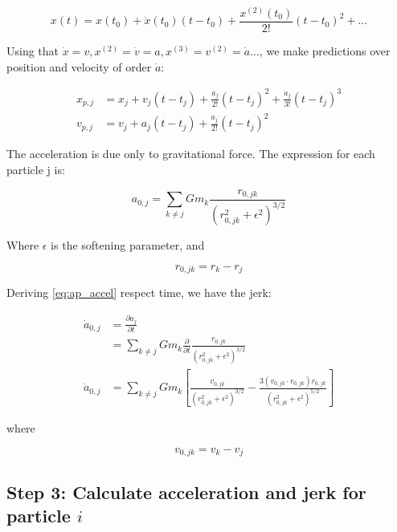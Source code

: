 \begin{appendixs}
	\begin{equation}
		x(t) = x(t_0) + \dot{x}(t_0)(t - t_0) + \frac{x^{(2)}(t_0)}{2!}(t - t_0)^2 + ...
	\end{equation}
	
	Using that $\dot{x} = v, x^{(2)} = \dot{v} = a, x^{(3)} = v^{(2)} = \dot{a} ...$, we make predictions over position and velocity of order $\dot{a}$:
	
	\begin{align}
		x_{p, j} &= x_j + v_j (t - t_j) + \frac{a_j}{2!} (t-t_j)^2 + \frac{\dot{a}_j}{3!} (t-t_j)^3 \label{eq:ap_xpred} \\
		v_{p, j} &= v_j + a_j (t - t_j) + \frac{\dot{a}_j}{2!} (t-t_j)^2
	\end{align}
	
	The acceleration is due only to gravitational force. The expression for each particle j is:
	
	\begin{equation}
		a_{0, j} = \sum_{k \neq j} G m_k \frac{r_{0,jk}}{(r_{0,jk}^2 + \epsilon^2)^{3/2}} \label{eq:ap_accel}
	\end{equation}
	
	Where $\epsilon$ is the softening parameter, and
	
	\begin{equation}
		r_{0,jk} = r_{k} - r_{j}
	\end{equation}
	
	Deriving \ref{eq:ap_accel} respect time, we have the jerk:
	
	\begin{align}
		\dot{a}_{0, j} &= \frac{\partial a_j}{\partial t} \\
		&= \sum_{k \neq j} G m_k \frac{\partial}{\partial t}\frac{r_{0,jk}}{(r_{0,jk}^2 + \epsilon^2)^{3/2}} \\
		\dot{a}_{0, j} &= \sum_{k \neq j} G m_k \left[\frac{v_{0,jk}}{(r_{0,jk}^2 + \epsilon^2)^{3/2}} - \frac{3(v_{0,jk} \cdot r_{0,jk})r_{0,jk}}{(r_{0,jk}^2 + \epsilon^2)^{5/2}}\right] \label{eq:ap_jerk}
	\end{align}
	
	where
	
	\begin{equation}
		v_{0,jk} = v_{k} - v_{j}
	\end{equation}
	
	\subsection{Step 3: Calculate acceleration and jerk for particle $i$}
	

\end{appendixs}
